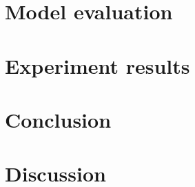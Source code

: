 \documentclass[twocolumn, 11pt]{article} \linespread{1}
\begin{document}
\section*{Model evaluation}

\section*{Experiment results}


\section*{Conclusion}

\section*{Discussion}
\end{document}

